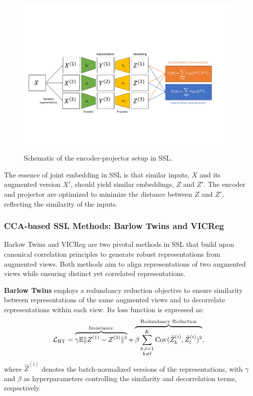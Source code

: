 \begin{figure}[ht]
    \centering
    \includegraphics[width=0.99\textwidth]{figures/ssl_schematic}
    \caption{Schematic of the encoder-projector setup in SSL.}
    \label{fig:sslschematic}
\end{figure}

The essence of joint embedding in SSL is that similar inputs, \( X \) and its augmented version \( X' \), should yield similar embeddings, \( Z \) and \( Z' \).
The encoder and projector are optimized to minimize the distance between \( Z \) and \( Z' \), reflecting the similarity of the inputs.

\subsubsection{CCA-based SSL Methods: Barlow Twins and VICReg}
Barlow Twins and VICReg are two pivotal methods in SSL that build upon canonical correlation principles to generate robust representations from augmented views.
Both methods aim to align representations of two augmented views while ensuring distinct yet correlated representations.

\textbf{Barlow Twins} employs a redundancy reduction objective to ensure similarity between representations of the same augmented views and to decorrelate representations within each view.
Its loss function is expressed as:
\begin{align}
    \mathcal{L}_\text{BT} = \overbrace{\gamma \mathbb{E} \lVert Z^{(1)} - Z^{(2)}\rVert^2}^{\text{Invariance}} + \overbrace{\beta \sum_{\substack{k,l=1 \\ k \neq l}}^K \mathrm{Cov}(\hat{Z}^{(i)}_k, \hat{Z}^{(i)}_l)^2}^{\text{Redundancy Reduction}},
\end{align}
where \( \hat{Z}^{(i)} \) denotes the batch-normalized versions of the representations, with \( \gamma \) and \( \beta \) as hyperparameters controlling the similarity and decorrelation terms, respectively.

